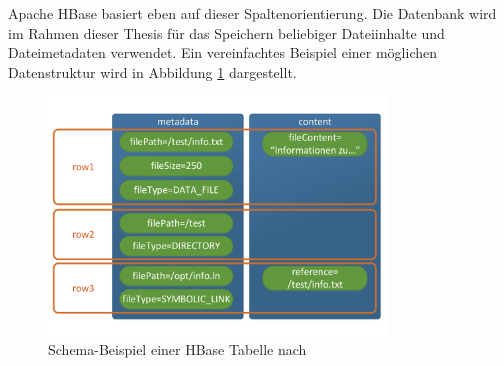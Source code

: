 \noindent
Apache HBase basiert eben auf dieser Spaltenorientierung. Die Datenbank wird im Rahmen dieser Thesis für das Speichern beliebiger Dateiinhalte und Dateimetadaten verwendet. Ein vereinfachtes Beispiel einer möglichen Datenstruktur wird in Abbildung \ref{fig:hbase_schema_example} dargestellt.\\

\begin{figure}[ht]
  \centering
  \includegraphics[width=0.8\textwidth]{./resource/hbase_data_schema_example.pdf}
  \caption{Schema-Beispiel einer HBase Tabelle nach \cite{big_data_praxis}}
  \label{fig:hbase_schema_example}
\end{figure}

